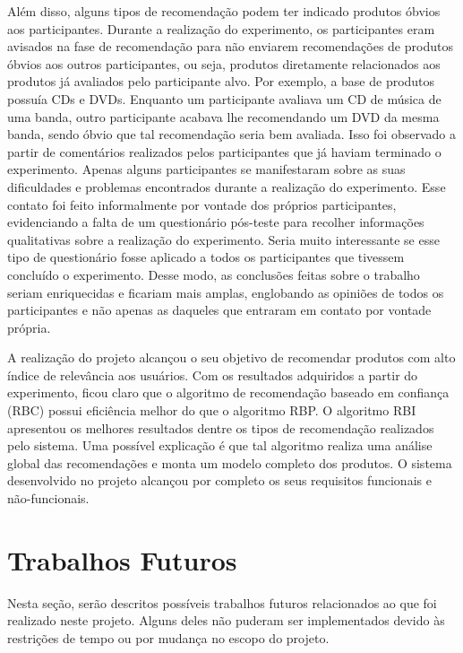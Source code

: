   Além disso, alguns tipos de recomendação podem ter indicado produtos óbvios aos participantes. Durante a realização do experimento, os participantes eram avisados na fase de recomendação para não enviarem recomendações de produtos óbvios aos outros participantes, ou seja, produtos diretamente relacionados aos produtos já avaliados pelo participante alvo. Por exemplo, a base de produtos possuía CDs e DVDs. Enquanto um participante avaliava um CD de música de uma banda, outro participante acabava lhe recomendando um DVD da mesma banda, sendo óbvio que tal recomendação seria bem avaliada. Isso foi observado a partir de comentários realizados pelos participantes que já haviam terminado o experimento. Apenas alguns participantes se manifestaram sobre as suas dificuldades e problemas encontrados durante a realização do experimento. Esse contato foi feito informalmente por vontade dos próprios participantes, evidenciando a falta de um questionário pós-teste para recolher informações qualitativas sobre a realização do experimento. Seria muito interessante se esse tipo de questionário fosse aplicado a todos os participantes que tivessem concluído o experimento. Desse modo, as conclusões feitas sobre o trabalho seriam enriquecidas e ficariam mais amplas, englobando as opiniões de todos os participantes e não apenas as daqueles que entraram em contato por vontade própria.

  A realização do projeto alcançou o seu objetivo de recomendar produtos com alto índice de relevância aos usuários. Com os resultados adquiridos a partir do experimento, ficou claro que o algoritmo de recomendação baseado em confiança (RBC) possui eficiência melhor do que o algoritmo RBP. O algoritmo RBI apresentou os melhores resultados dentre os tipos de recomendação realizados pelo sistema. Uma possível explicação é que tal algoritmo realiza uma análise global das recomendações e monta um modelo completo dos produtos. O sistema desenvolvido no projeto alcançou por completo os seus requisitos funcionais e não-funcionais.


\section{Trabalhos Futuros}
\label{sec:trabalho_futuros}

 Nesta seção, serão descritos possíveis trabalhos futuros relacionados ao que foi realizado neste projeto. Alguns deles não puderam ser implementados devido às restrições de tempo ou por mudança no escopo do projeto.

